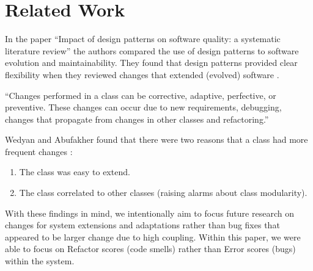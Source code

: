 
\section{Related Work}

In the paper ``Impact of design patterns on software quality: a systematic literature review'' the authors compared the use of design patterns to software evolution and maintainability. They found that design patterns provided clear flexibility when they reviewed changes that extended (evolved) software \cite{wedyan:2020}.

\vspace{0.25cm}
\begin{displayquote}
``Changes performed in a class can be corrective, adaptive, perfective, or preventive. These changes can occur due to new requirements, debugging, changes that propagate from changes in other classes and refactoring.''
\end{displayquote}
\vspace{0.25cm}

Wedyan and Abufakher found that there were two reasons that a class had more frequent changes \cite{wedyan:2020}:

\vspace{0.25cm}
\begin{enumerate}
    \item The class was easy to extend.
    \item The class correlated to other classes (raising alarms about class modularity).
\end{enumerate}
\vspace{0.25cm}

With these findings in mind, we intentionally aim to focus future research on changes for system extensions and adaptations rather than bug fixes that appeared to be larger change due to high coupling. Within this paper, we were able to focus on Refactor scores (code smells) rather than Error scores (bugs) within the system.
